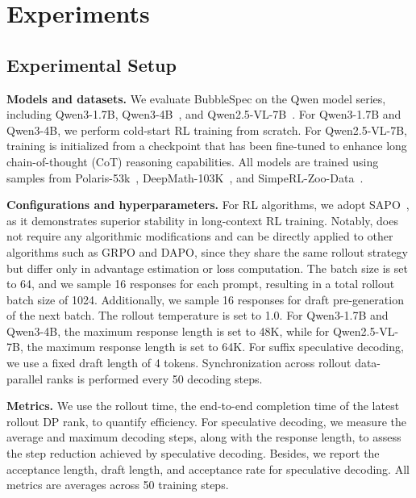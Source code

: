 


\section{Experiments} 

% 
% 


\subsection{Experimental Setup} 

\textbf{Models and datasets.} We evaluate BubbleSpec on the Qwen model series, including Qwen3-1.7B, Qwen3-4B~\cite{yang2025qwen3}, and Qwen2.5-VL-7B~\cite{bai2025qwen2}. For Qwen3-1.7B and Qwen3-4B, we perform cold-start RL training from scratch. For Qwen2.5-VL-7B, training is initialized from a checkpoint that has been fine-tuned to enhance long chain-of-thought (CoT) reasoning capabilities. All models are trained using samples from Polaris-53k~\cite{an2025polaris}, DeepMath-103K~\cite{he2025deepmath}, and SimpeRL-Zoo-Data~\cite{zeng2025simplerl}. 


\textbf{Configurations and hyperparameters.} For RL algorithms, we adopt SAPO~\cite{gao2025soft_sapo}, as it demonstrates superior stability in long-context RL training. 
Notably, \model does not require any algorithmic modifications and can be directly applied to other algorithms such as GRPO and DAPO, since they share the same rollout strategy but differ only in advantage estimation or loss computation. The batch size is set to 64, and we sample 16 responses for each prompt, resulting in a total rollout batch size of 1024. 
Additionally, we sample 16 responses for draft pre-generation of the next batch. The rollout temperature is set to 1.0. For Qwen3-1.7B and Qwen3-4B, the maximum response length is set to 48K, while for Qwen2.5-VL-7B, the maximum response length is set to 64K. 
For suffix speculative decoding, we use a fixed draft length of 4 tokens. Synchronization across rollout data-parallel ranks is performed every 50 decoding steps.


\textbf{Metrics.} We use the rollout time, \ie the end-to-end completion time of the latest rollout DP rank, to quantify efficiency. For speculative decoding, we measure the average and maximum decoding steps, along with the response length, to assess the step reduction achieved by speculative decoding. Besides, we report the acceptance length, draft length, and acceptance rate for speculative decoding. All metrics are averages across 50 training steps.


